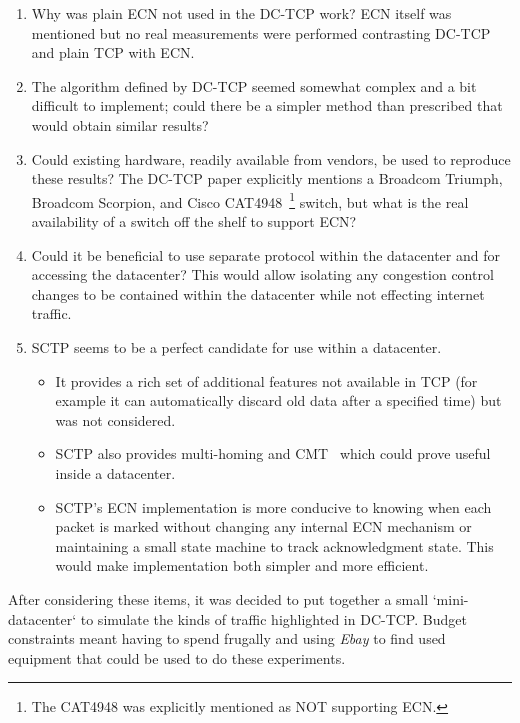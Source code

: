 \documentclass[12pt]{article}
\begin{document}
\begin{enumerate}
\item Why was plain ECN not used in the DC-TCP work? ECN itself was mentioned but no
real measurements were performed contrasting DC-TCP and plain TCP with ECN.

\item The algorithm defined by DC-TCP seemed somewhat complex and a bit difficult to
implement; could there be a simpler method than prescribed that would obtain similar results?

\item Could existing hardware, readily available from vendors, be used to reproduce these results? The
DC-TCP paper explicitly mentions a  Broadcom Triumph,  Broadcom Scorpion, and Cisco CAT4948~\footnote{The 
CAT4948 was explicitly mentioned as NOT supporting ECN.} switch, but what is the real availability of 
a switch off the shelf to support ECN?

\item Could it be beneficial to use separate protocol within the datacenter and for accessing the datacenter?
      This would allow isolating any congestion control changes to be contained within the datacenter
      while not effecting internet traffic.

\item SCTP seems to be a perfect candidate for use within a datacenter.

\begin{itemize}
\item It provides a rich set of additional features not available in
      TCP (for example it can automatically discard old data after a specified time) but was not considered. 

\item SCTP also provides multi-homing and CMT~\cite{jana} which could prove useful inside a datacenter.

\item SCTP's ECN implementation is more conducive to knowing when each packet is marked without
      changing any internal ECN mechanism or maintaining a small state machine to track acknowledgment state. 
      This would make implementation both simpler and more efficient.
\end{itemize}

\end{enumerate}

After considering these items, it was decided to put together a small `mini-datacenter` to simulate the
kinds of traffic highlighted in DC-TCP. Budget constraints meant having to spend frugally and 
using \emph{Ebay} to find used equipment that could be used to do these experiments.
\end{document}
